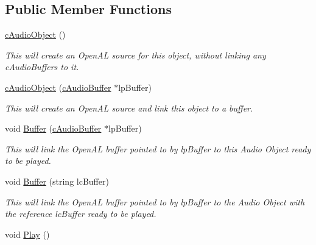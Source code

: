 \subsection*{Public Member Functions}
\begin{DoxyCompactItemize}
\item 
\hypertarget{classc_audio_object_a1a44ae87c2bf5e43aff66624a42771fe}{
\hyperlink{classc_audio_object_a1a44ae87c2bf5e43aff66624a42771fe}{cAudioObject} ()}
\label{classc_audio_object_a1a44ae87c2bf5e43aff66624a42771fe}

\begin{DoxyCompactList}\small\item\em This will create an OpenAL source for this object, without linking any cAudioBuffers to it. \end{DoxyCompactList}\item 
\hypertarget{classc_audio_object_a172d5d9e89376a0c505fa051e9d02919}{
\hyperlink{classc_audio_object_a172d5d9e89376a0c505fa051e9d02919}{cAudioObject} (\hyperlink{classc_audio_buffer}{cAudioBuffer} $\ast$lpBuffer)}
\label{classc_audio_object_a172d5d9e89376a0c505fa051e9d02919}

\begin{DoxyCompactList}\small\item\em This will create an OpenAL source and link this object to a buffer. \end{DoxyCompactList}\item 
\hypertarget{classc_audio_object_acac2ff64aad76d82631497e6367891b6}{
void \hyperlink{classc_audio_object_acac2ff64aad76d82631497e6367891b6}{Buffer} (\hyperlink{classc_audio_buffer}{cAudioBuffer} $\ast$lpBuffer)}
\label{classc_audio_object_acac2ff64aad76d82631497e6367891b6}

\begin{DoxyCompactList}\small\item\em This will link the OpenAL buffer pointed to by lpBuffer to this Audio Object ready to be played. \end{DoxyCompactList}\item 
\hypertarget{classc_audio_object_a0cca638434e74bb9e7de88c9a3ccf1af}{
void \hyperlink{classc_audio_object_a0cca638434e74bb9e7de88c9a3ccf1af}{Buffer} (string lcBuffer)}
\label{classc_audio_object_a0cca638434e74bb9e7de88c9a3ccf1af}

\begin{DoxyCompactList}\small\item\em This will link the OpenAL buffer pointed to by lpBuffer to the Audio Object with the reference lcBuffer ready to be played. \end{DoxyCompactList}\item 
\hypertarget{classc_audio_object_a2e7c8dc824eef10006f0f1c2824f10cd}{
void \hyperlink{classc_audio_object_a2e7c8dc824eef10006f0f1c2824f10cd}{Play} ()}
\label{classc_audio_object_a2e7c8dc824eef10006f0f1c2824f10cd}


\end{DoxyCompactItemize}
